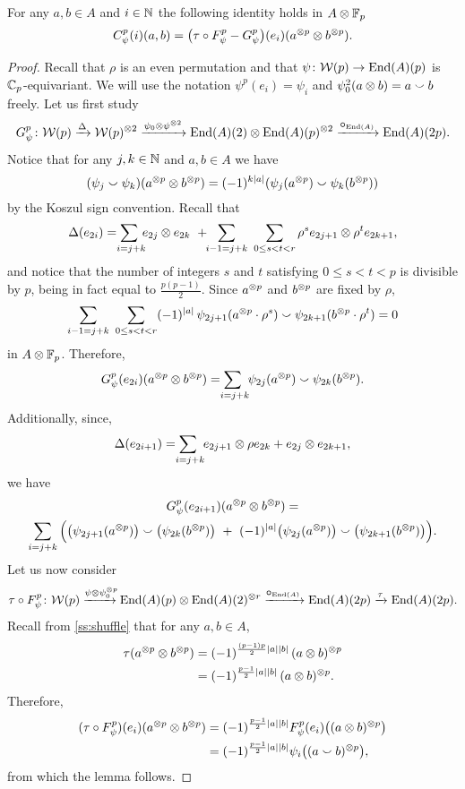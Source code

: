 \begin{lemma}\label{l:F_and_G_give_C}
	For any $a,b \in A$ and $i \in \mathbb{N}$ the following identity holds in $A \otimes {\mathbb{F}_p}$
	\[
	C^p_\psi(i)(a,b) =
	\big(\tau \mathbin{\circ} F^p_\psi - G^p_\psi\big)(e_i)(a^{\otimes p} \otimes b^{\otimes p}).
	\]
\end{lemma}

\begin{proof}
	Recall that $\rho$ is an even permutation and that $\psi \colon \mathcal{W}(p) \to \mathrm{End}(A)(p)$ is $\mathbb{C}_p$-equivariant.
	We will use the notation $\psi^p(e_i) = \psi_i$ and $\psi^2_0(a \otimes b) = a \smallsmile b$ freely.
	Let us first study
	\[
	G_\psi^p \colon \mathcal{W}(p) \xrightarrow{\Delta}
	\mathcal{W}(p)^{\otimes 2} \xrightarrow{\psi_0 \otimes \psi^{\otimes 2}}
	\mathrm{End}(A)(2) \otimes \mathrm{End}(A)(p)^{\otimes 2} \xrightarrow{\bm{\mathbin{\circ}}_{\mathrm{End}(A)}}
	\mathrm{End}(A)(2p).
	\]
	Notice that for any $j,k \in \mathbb{N}$ and $a,b \in A$ we have
	\[
	(\psi_j \smallsmile \psi_k)(a^{\otimes p} \otimes b^{\otimes p}) = (-1)^{k\lvert a\rvert}(\psi_j(a^{\otimes p}) \smallsmile \psi_k(b^{\otimes p}))
	\]
	by the Koszul sign convention.
	Recall that
	\[
	\Delta(e_{2i}) =
	\sum_{\mathclap{\ i=j+k}} \, e_{2j} \ot e_{2k} \ + \!\!
	\sum_{i-1=j+k} \ \sum_{0 \leq s<t<r} \rho^s e_{2j+1} \ot \rho^t e_{2k+1},
	\]
	and notice that the number of integers $s$ and $t$ satisfying $0 \leq s < t < p$ is divisible by $p$, being in fact equal to $\frac{p(p-1)}{2}$.
	Since $a^{\otimes p}$ and $b^{\otimes p}$ are fixed by $\rho$,
	\[
	\sum_{i-1=j+k} \ \sum_{0 \leq s < t < r} (-1)^{\lvert a\rvert} \, \psi_{2j+1}(a^{\otimes p} \cdot \rho^s) \smallsmile \psi_{2k+1}(b^{\otimes p} \cdot \rho^t)
	= 0
	\]
	in $A \otimes {\mathbb{F}_p}$.
	Therefore,
	\[
	G_\psi^p(e_{2i})(a^{\ot p} \ot b^{\ot p}) =
	\sum_{\mathclap{\ i=j+k}} \ \psi_{2j}(a^{\ot p}) \smallsmile \psi_{2k}(b^{\ot p}).
	\]
	Additionally, since,
	\[
	\Delta(e_{2i+1}) =
	\sum_{\mathclap{\ i=j+k}} \ e_{2j+1} \ot \rho e_{2k} + e_{2j} \ot e_{2k+1},
	\]
	we have
	\begin{multline*}
		G_\psi^p(e_{2i+1})(a^{\otimes p} \otimes b^{\otimes p}) = \\
		\sum_{i=j+k} \Big(
		\big(\psi_{2j+1}(a^{\otimes p})\big) \smallsmile \big(\psi_{2k}(b^{\otimes p})\big)\ +\
		(-1)^{\lvert a\rvert}\big(\psi_{2j}(a^{\otimes p})\big) \smallsmile \big(\psi_{2k+1}(b^{\otimes p})\big)
		\Big).
	\end{multline*}
	Let us now consider
	\[
	\tau \mathbin{\circ} F_\psi^p \colon \mathcal{W}(p) \xrightarrow{\!\psi \otimes \psi_0^{\otimes p}\hspace*{-5pt}}
	\mathrm{End}(A)(p) \otimes \mathrm{End}(A)(2)^{\otimes r} \xrightarrow{\!\bm{\mathbin{\circ}}_{\mathrm{End}(A)}}
	\mathrm{End}(A)(2p) \xrightarrow{\tau} \mathrm{End}(A)(2p).
	\]
	Recall from \cref{ss:shuffle} that for any $a,b \in A$,
	\begin{align*}
		\tau(a^{\otimes p} \otimes b^{\otimes p}) &=
		(-1)^{\frac{(p-1)p}{2}\lvert a\rvert\lvert b\rvert} \, (a \otimes b)^{\otimes p} \\ &=
		(-1)^{\frac{p-1}{2}\lvert a\rvert\lvert b\rvert} \, (a \otimes b)^{\otimes p}.
	\end{align*}
	Therefore,
	\begin{align*}
		(\tau \mathbin{\circ} F_\psi^p)(e_i)(a^{\otimes p} \otimes b^{\otimes p}) &=
		(-1)^{\frac{p-1}{2}\lvert a\rvert\lvert b\rvert} F_\psi^p(e_i)\big((a \otimes b)^{\otimes p}\big) \\ &=
		(-1)^{\frac{p-1}{2}\lvert a\rvert\lvert b\rvert} \psi_{i}\big((a \smallsmile b)^{\otimes p}\big),
	\end{align*}
	from which the lemma follows.
\end{proof}

